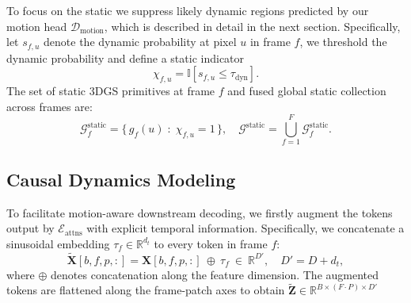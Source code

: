 To focus on the static we suppress likely dynamic regions predicted by our motion head $\mathcal{D}_{\text{motion}}$, which is described in detail in the next section. Specifically, let $s_{f,u}$  denote the dynamic probability at pixel $u$ in frame $f$, we threshold the dynamic probability and define a static indicator
\[
\chi_{f,u}=
\mathbb{I}\!\left[s_{f,u}\le \tau_{\text{dyn}}\right].
\]
 The set of static 3DGS primitives at frame $f$ and fused global static collection across frames are:
\[
\mathcal{G}^{\text{static}}_f=\big\{\,g_f(u)\;:\;\chi_{f,u}=1\,\big\},  \quad \mathcal{G}^{\text{static}}=\bigcup_{f=1}^{F}\mathcal{G}^{\text{static}}_f.
\]

\subsection{Causal Dynamics Modeling}\label{sec:causal}

To facilitate motion-aware downstream decoding, we firstly augment the tokens output by $\mathcal{E}_{\text{attns}}$ with explicit temporal information. Specifically, we concatenate a sinusoidal embedding $\tau_f \in \mathbb{R}^{d_t} $ to every token in frame $f$:
 \[
\tilde{\mathbf{X}}[b,f,p,:]=\mathbf{X}[b,f,p,:]\ \oplus\ \tau_f\ \in\ \mathbb{R}^{D'},\quad D'=D+d_t,
\]
where $\oplus$ denotes concatenation along the feature dimension. The augmented tokens are flattened along the frame-patch axes to obtain $\mathbf{\tilde{Z}}\in\mathbb{R}^{B\times(F\!\cdot\!P)\times D'}$

